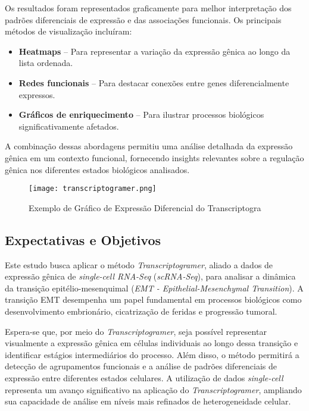 \documentclass[12pt]{article}
\begin{document}
Os resultados foram representados graficamente para melhor interpretação dos padrões diferenciais de expressão e das associações funcionais. Os principais métodos de visualização incluíram:
\begin{itemize}
    \item \textbf{Heatmaps} – Para representar a variação da expressão gênica ao longo da lista ordenada.
    \item \textbf{Redes funcionais} – Para destacar conexões entre genes diferencialmente expressos.
    \item \textbf{Gráficos de enriquecimento} – Para ilustrar processos biológicos significativamente afetados.
\end{itemize}

A combinação dessas abordagens permitiu uma análise detalhada da expressão gênica em um contexto funcional, fornecendo insights relevantes sobre a regulação gênica nos diferentes estados biológicos analisados.

\begin{figure}
    \centering
    \texttt{[image: transcriptogramer.png]}
    \caption{Exemplo de Gráfico de Expressão Diferencial do Transcriptogra \cite{morais}}
    \label{fig:enter-label}
\end{figure}

\subsection{Expectativas e Objetivos}

Este estudo busca aplicar o método \textit{Transcriptogramer}, aliado a dados de expressão gênica de \textit{single-cell RNA-Seq} (\textit{scRNA-Seq}), para analisar a dinâmica da transição epitélio-mesenquimal (\textit{EMT - Epithelial-Mesenchymal Transition}). A transição EMT desempenha um papel fundamental em processos biológicos como desenvolvimento embrionário, cicatrização de feridas e progressão tumoral.  

Espera-se que, por meio do \textit{Transcriptogramer}, seja possível representar visualmente a expressão gênica em células individuais ao longo dessa transição e identificar estágios intermediários do processo. Além disso, o método permitirá a detecção de agrupamentos funcionais e a análise de padrões diferenciais de expressão entre diferentes estados celulares. A utilização de dados \textit{single-cell} representa um avanço significativo na aplicação do \textit{Transcriptogramer}, ampliando sua capacidade de análise em níveis mais refinados de heterogeneidade celular.
\end{document}
